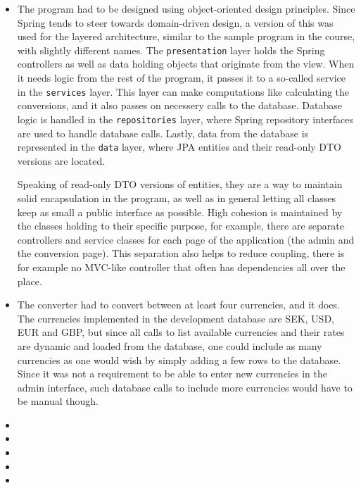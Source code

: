 \documentclass[a4paper]{scrartcl}
\def\code#1{\texttt{#1}}
\begin{document}
\begin{itemize}
    \item The program had to be designed using object-oriented design principles. Since Spring tends to steer towards domain-driven design, a version of this was used for the layered architecture, similar to the sample program in the course, with slightly different names. The \code{presentation} layer holds the Spring controllers as well as data holding objects that originate from the view. When it needs logic from the rest of the program, it passes it to a so-called service in the \code{services} layer. This layer can make computations like calculating the conversions, and it also passes on necessery calls to the database. Database logic is handled in the \code{repositories} layer, where Spring repository interfaces are used to handle database calls. Lastly, data from the database is represented in the \code{data} layer, where JPA entities and their read-only DTO versions are located.

        Speaking of read-only DTO versions of entities, they are a way to maintain solid encapsulation in the program, as well as in general letting all classes keep as small a public interface as possible. High cohesion is maintained by the classes holding to their specific purpose, for example, there are separate controllers and service classes for each page of the application (the admin and the conversion page). This separation also helps to reduce coupling, there is for example no MVC-like controller that often has dependencies all over the place.

    \item The converter had to convert between at least four currencies, and it does. The currencies implemented in the development database are SEK, USD, EUR and GBP, but since all calls to list available currencies and their rates are dynamic and loaded from the database, one could include as many currencies as one would wish by simply adding a few rows to the database. Since it was not a requirement to be able to enter new currencies in the admin interface, such database calls to include more currencies would have to be manual though.
    \item 
    \item 
    \item 
    \item 
    \item 
\end{itemize}
\end{document}
